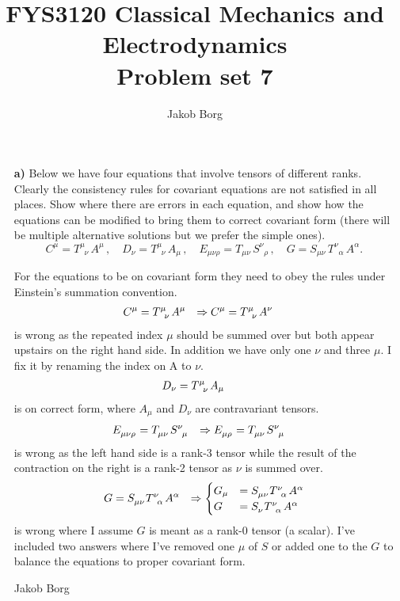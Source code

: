 \documentclass[11pt,a4paper]{report}
\title{FYS3120 Classical Mechanics and Electrodynamics\\ 
\vspace{15mm}Problem set 7}
\author{Jakob Borg}
\newcounter{excount}[chapter]
\newenvironment{exercise}[1][]{\addtocounter{excount}{1} \noindent {\bf Problem
    \arabic{excount} \ \ #1}\hspace{2mm}}{\vspace{4mm}}
\newenvironment{solution}[1][]
    {\begin{tcolorbox}[title=Solution #1,halign lower=right,breakable]
    }
    {
    \tcblower Jakob Borg
    \end{tcolorbox}
	\vspace{5mm}
    }
\begin{document}

\maketitle


\begin{exercise}
\begin{itemize}
\item[\bf a)] Below we have four equations that involve tensors of different ranks. Clearly the consistency rules for covariant equations are not satisfied in all places. Show where there are errors in each equation, and show how the equations can be modified to bring them to correct covariant form (there will be multiple alternative solutions but we prefer the simple ones).
\begin{equation}
C^{\mu}=T^{\mu}_{\;\;\nu}\, A^{\mu}\,,\quad D_{\nu}=T^{\mu}_{\;\;\nu} \,A_{\mu}\,,\quad
E_{\mu\nu\rho}=T_{\mu\nu}\,S^{\nu}_{\;\;\rho}\,,\quad G=S_{\mu\nu}\,T^{\nu}_{\;\;\alpha}\, A^{\alpha}.
\end{equation}
\begin{solution}[\bf 1.a]
For the equations to be on covariant form they need to obey the rules under Einstein's summation convention.
\begin{align*}
C^\mu &= T\indices{^\mu_\nu} A^\mu & \Rightarrow C^\mu &= T\indices{^\mu_\nu} A^\nu
\end{align*}
is wrong as the repeated index $\mu$ should be summed over but both appear upstairs on the right hand side. In addition we have only one $\nu$ and three $\mu$. I fix it by renaming the index on A to $\nu$.
\begin{align*}
D_\nu &= T\indices{^\mu_\nu} A_\mu & & &
\end{align*}
is on correct form, where $A_\mu$ and $D_\nu$ are contravariant tensors.
\begin{align*}
E\indices{_\mu_\nu_\rho} &= T\indices{_\mu_\nu}S\indices{^\nu_\mu} & \Rightarrow E\indices{_\mu_\rho} &= T\indices{_\mu_\nu}S\indices{^\nu_\mu} 
\end{align*}
is wrong as the left hand side is a rank-3 tensor while the result of the contraction on the right is a rank-2 tensor as $\nu$ is summed over.
\begin{align*}
G &= S\indices{_\mu_\nu}T\indices{^\nu_\alpha} A^\alpha & \Rightarrow \begin{cases}
G_\mu &= S\indices{_\mu_\nu}T\indices{^\nu_\alpha} A^\alpha 
\\
G &= S\indices{_\nu}T\indices{^\nu_\alpha} A^\alpha
\end{cases}
\end{align*}
is wrong where I assume $G$ is meant as a rank-0 tensor (a scalar). I've included two answers where I've removed one $\mu$ of $S$ or added one to the $G$ to balance the equations to proper covariant form.
\end{solution}


\end{itemize}
\end{exercise}
\end{document}
